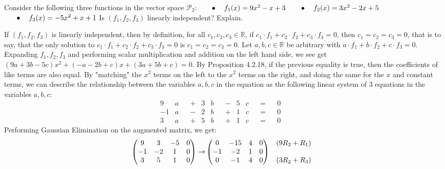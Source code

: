 \documentclass[12pt]{article}
\newenvironment{problem}[2][Problem]
{
	\begin{trivlist} 
		\item[\hskip \labelsep {\bfseries #1 #2:}]
	}
{
	\end{trivlist}
	}
\newenvironment{solution}[1][Solution]
{
	\begin{trivlist} 
		\item[\hskip \labelsep {\itshape #1:}]
	}
	{
	\end{trivlist}
}
\begin{document}
\newpage
\begin{problem}{3}
Consider the following three functions in the vector space $\mathcal{P}_2$:
\newline
\newline
$\hphantom{100} \bullet \hphantom{10} f_1(x)=9x^2-x+3$
\newline
\newline
$\hphantom{100} \bullet \hphantom{10} f_2(x)=3x^2-2x+5$
\newline
\newline
$\hphantom{100} \bullet \hphantom{10} f_3(x)=-5x^2+x+1$
\newline
\newline
\noindent
Is $(f_1,f_2,f_3)$ linearly independent? Explain.
\noindent
\newline
\newline
\begin{solution}
If $(f_1,f_2,f_3)$ is linearly independent, then by definition, for all $c_1,c_2,c_3 \in \mathbb{R}$, if $c_1\cdot f_1 + c_2 \cdot f_2 + c_3 \cdot f_3=0$, then $c_1=c_2=c_3=0$, that is to say, that the only solution to $c_1\cdot f_1 + c_2 \cdot f_2 + c_3 \cdot f_3=0$ is $c_1=c_2=c_3=0$. Let $a,b,c \in \mathbb{R}$ be arbitrary with $a\cdot f_1 + b \cdot f_2 + c \cdot f_3=0$. Expanding $f_1,f_2,f_3$ and performing scalar multiplication and addition on the left hand side, we see get $(9a+3b-5c)x^2+(-a-2b+c)x+(3a+5b+c) =0$. By Proposition 4.2.18, if the previous equality is true, then the coefficients of like terms are also equal. By "matching" the $x^2$ terms on the left to the $x^2$ terms on the right, and doing the same for the $x$ and constant terms, we can describe the relationship between the variables $a,b,c$ in the equation as the following linear system of 3 equations in the variables $a,b,c$:
\begin{align*}
&&&&&&&& &&&&&&&& &&&&&&&& 9&a& &+& 3&b& &-& 5&c& &=& &0& &&&&&&&& &&&&&&&& &&&&&&&&\\
&&&&&&&& &&&&&&&& &&&&&&&& -1&a& &-& 2&b& &+& 1&c& &=& &0& &&&&&&&& &&&&&&&& &&&&&&&&\\
&&&&&&&& &&&&&&&& &&&&&&&& 3&a& &+& 5&b& &+& 1&c& &=& &0& &&&&&&&& &&&&&&&& &&&&&&&&
\end{align*}
Performing Gaussian Elimination on the augmented matrix, we get:
\begin{align*}
\begin{pmatrix}9&3&-5&0\\-1&-2&1&0\\3&5&1&0\end{pmatrix} \rightarrow &\begin{pmatrix}0&-15&4&0\\-1&-2&1&0\\0&-1&4&0\end{pmatrix} & \begin{matrix} (9R_2+R_1)\hphantom{1}\\ \hphantom{1}\\ (3R_2+R_3)\hphantom{1}\end{matrix} \\

\end{align*}
\end{solution}
\end{problem}
\end{document}
